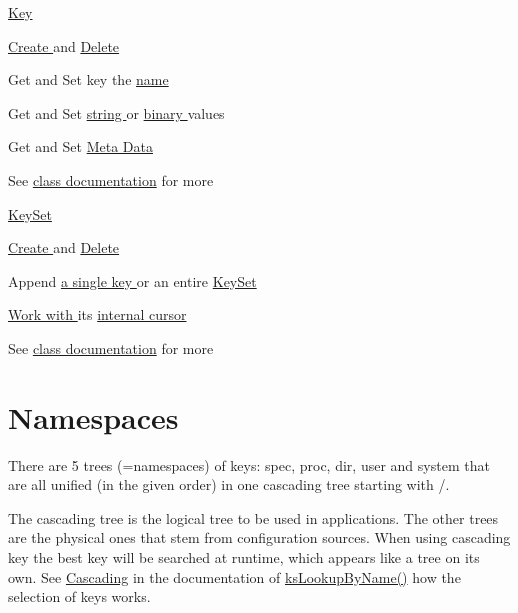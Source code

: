\hyperlink{group__key}{Key }
\begin{DoxyItemize}
\item \hyperlink{group__key_gad23c65b44bf48d773759e1f9a4d43b89}{Create } and \hyperlink{group__key_ga3df95bbc2494e3e6703ece5639be5bb1}{Delete }
\item Get and Set key the \hyperlink{group__keyname_ga7699091610e7f3f43d2949514a4b35d9}{name }
\item Get and Set \hyperlink{group__keyvalue_ga622bde1eb0e0c4994728331326340ef2}{string } or \hyperlink{group__keyvalue_gaa50a5358fd328d373a45f395fa1b99e7}{binary } values
\item Get and Set \hyperlink{group__keymeta}{Meta Data }
\item See \hyperlink{group__key}{class documentation} for more
\end{DoxyItemize}

\hyperlink{group__keyset}{Key\+Set }
\begin{DoxyItemize}
\item \hyperlink{group__keyset_ga671e1aaee3ae9dc13b4834a4ddbd2c3c}{Create } and \hyperlink{group__keyset_ga27e5c16473b02a422238c8d970db7ac8}{Delete }
\item Append \hyperlink{group__keyset_gaa5a1d467a4d71041edce68ea7748ce45}{a single key } or an entire \hyperlink{group__keyset_ga21eb9c3a14a604ee3a8bdc779232e7b7}{Key\+Set }
\item \hyperlink{group__keyset_ga317321c9065b5a4b3e33fe1c399bcec9}{Work with } its \hyperlink{group__keyset_ga4287b9416912c5f2ab9c195cb74fb094}{internal cursor }
\item See \hyperlink{group__keyset}{class documentation} for more
\end{DoxyItemize}\hypertarget{index_namespace}{}\section{Namespaces}\label{index_namespace}
There are 5 trees (=namespaces) of keys\+: {\ttfamily spec}, {\ttfamily proc}, {\ttfamily dir}, {\ttfamily user} and {\ttfamily system} that are all unified (in the given order) in one cascading tree starting with {\ttfamily /}.

The cascading tree is the logical tree to be used in applications. The other trees are the physical ones that stem from configuration sources. When using cascading key the best key will be searched at runtime, which appears like a tree on its own. See \hyperlink{group__keyset_cascading}{Cascading} in the documentation of \hyperlink{group__keyset_gad2e30fb6d4739d917c5abb2ac2f9c1a1}{ks\+Lookup\+By\+Name()} how the selection of keys works.


